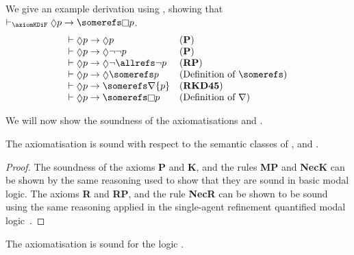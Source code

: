 \begin{example}
We give an example derivation using \axiomKDiF{}, showing that
$\proves_{\axiomKDiF} \suspects p \implies \somerefs \knows p$.
$$
\begin{array}{ll}
\proves \suspects p \implies \suspects p & \text{({\bf P})}\\
\proves \suspects p \implies \suspects \neg \neg p & \text{({\bf P})}\\
\proves \suspects p \implies \suspects \neg \allrefs \neg p & \text{({\bf RP})}\\
\proves \suspects p \implies \suspects \somerefs p & \text{(Definition of $\somerefs$)}\\
\proves \suspects p \implies \somerefs \covers \{ p \} & \text{({\bf RKD45})}\\
\proves \suspects p \implies \somerefs \knows p & \text{(Definition of $\covers$)}
\end{array}
$$
\end{example}

We will now show the soundness of the axiomatisations \axiomSiF{} and
\axiomKDiF{}.

\begin{lemma}
The axiomatisation \axiomFi{} is sound with respect to the semantic classes of
\classKi{}, \classSi{} and \classKDi{}.
\end{lemma}

\begin{proof}
The soundness of the axioms {\bf P} and {\bf K}, and the rules {\bf MP} and {\bf
NecK} can be shown by the same reasoning used to show that they are sound in
basic modal logic. The axioms {\bf R} and {\bf RP}, and the rule {\bf NecR} can
be shown to be sound using the same reasoning applied in the single-agent
refinement quantified modal logic~\cite{french2010future}.
\end{proof}

\begin{lemma}\label{single-sound-s5}
The axiomatisation \axiomSiF{} is sound for the logic \logicSiF{}.
\end{lemma}

